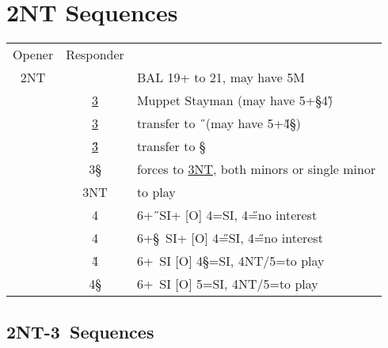 \newpage

\chapter{2NT Sequences}

\hypertarget{2n}{}
\begin{longtable}{C{\bidlength} C{\bidlength} | l}
Opener & Responder \\
2NT  & & BAL 19+ to 21, may have 5M \\
\hline\hline
&\hyperlink{2n3c}{3\C} & Muppet Stayman (may have 5+\S4\H) \\
&\hyperlink{2n3d}{3\D} & transfer to \H\ (may have 5+\H4\S) \\
&\hyperlink{2n3h}{3\H} & transfer to \S\ \\
& 3\S & forces to \hyperlink{2n3s3n}{3NT}, both minors or single minor \\
& 3NT & to play \\
& 4\C & 6+\H\ SI+ [O] 4\D=SI, 4\H=no interest \\
& 4\D & 6+\S\ SI+ [O] 4\H=SI, 4\H=no interest \\
& 4\H & 6+\C\ SI [O] 4\S=SI, 4NT/5\C=to play \\
& 4\S & 6+\D\ SI [O] 5\C=SI, 4NT/5\D=to play \\
\end{longtable}

\section{2NT-3\C\ Sequences}


